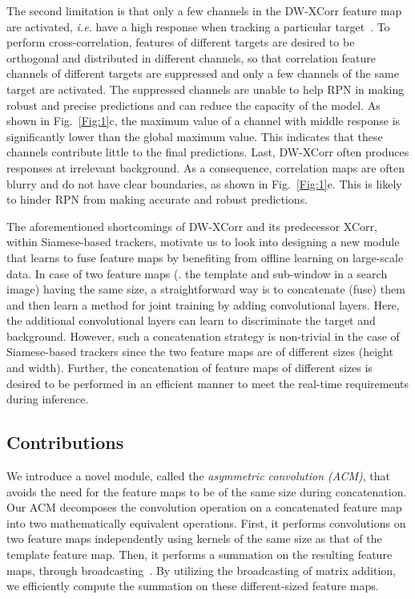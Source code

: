 \documentclass[10pt,twocolumn,letterpaper,final]{cvpr}
\begin{document}
The second limitation is that only a few channels in the DW-XCorr feature map are activated, \textit{i.e.} have a high response when tracking a particular target~\cite{li2019siamrpn}. To perform cross-correlation, features of different targets are desired to be orthogonal and distributed in different channels, so that correlation feature channels of different targets are suppressed and only a few channels of the same target are activated. The suppressed channels are unable to help RPN in making robust and precise predictions and can reduce the capacity of the model. As shown in Fig.~\ref{Fig:1}c, the maximum value of a channel with middle response is significantly lower than the global maximum value. This indicates that these channels contribute little to the final predictions. Last, DW-XCorr often produces responses at irrelevant background. As a consequence, correlation maps are often blurry and do not have clear boundaries, as shown in Fig.~\ref{Fig:1}e. This is likely to hinder RPN from making accurate and robust predictions.









The aforementioned shortcomings of DW-XCorr and its predecessor XCorr, within Siamese-based trackers, motivate us to look into designing a new module that learns to fuse feature maps by benefiting from offline learning on large-scale data. In case of two feature maps (\eg. the template and sub-window in a search image) having the same size, a straightforward way is to concatenate (fuse) them and then learn a method for joint training by adding convolutional layers. Here, the additional convolutional layers can learn to discriminate the target and background. However, such a concatenation strategy is non-trivial in the case of Siamese-based trackers since the two feature maps are of different sizes (height and width). Further, the concatenation of feature maps of different sizes is desired to be performed in an efficient manner to meet the real-time requirements during inference. 





\subsection{Contributions}
\label{section:contributions}

We introduce a novel module, called the \textit{asymmetric convolution (ACM)}, that avoids the need for the feature maps to be of the same size during concatenation. Our ACM decomposes the convolution operation on a concatenated feature map into two mathematically equivalent operations. First, it performs convolutions on two feature maps independently using kernels of the same size as that of the template feature map. Then, it performs a summation on the resulting feature maps, through broadcasting~\cite{numpy}. By utilizing the broadcasting of matrix addition, we efficiently compute the summation on these different-sized feature maps. 
\end{document}
